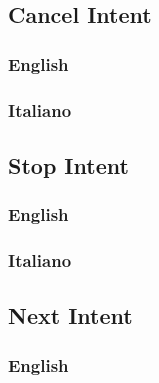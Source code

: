 \subsection{Cancel Intent}
\subsubsection{English}
\begin{itemize}
\end{itemize}

\subsubsection{Italiano}
\begin{itemize}
	
	
\end{itemize}




\subsection{Stop Intent}
\subsubsection{English}
\begin{itemize}	
	
\end{itemize}

\subsubsection{Italiano}

\begin{itemize}
	
\end{itemize}


\subsection{Next Intent}
\subsubsection{English}
\begin{itemize}
\end{itemize}

